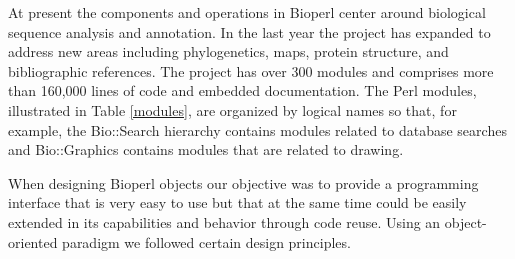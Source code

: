 \documentclass[12pt]{article}
\begin{document}
At present the components and operations in Bioperl center around
biological sequence analysis and annotation.  In the last year the
project has expanded to address new areas including phylogenetics,
maps, protein structure, and bibliographic references.  The project
has over 300 modules and comprises more than 160,000 lines of code and
embedded documentation.  The Perl modules, illustrated in Table
\ref{modules}, are organized by logical names so that, for example,
the Bio::Search hierarchy contains modules related to database
searches and Bio::Graphics contains modules that are related to
drawing.

When designing Bioperl objects our objective was to provide a
programming interface that is very easy to use but that at the same
time could be easily extended in its capabilities and behavior through
code reuse.  Using an object-oriented paradigm we followed certain
design principles.
\end{document}
